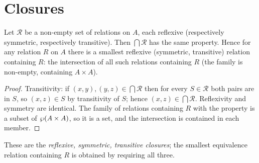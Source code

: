 \section{Closures}

\begin{proposition}\label{prop:closure}
	Let $\mathcal R$ be a non-empty set of relations on $A$, each reflexive (respectively symmetric, respectively transitive). Then $\bigcap\mathcal R$ has the same property. Hence for any relation $R$ on $A$ there is a smallest reflexive (symmetric, transitive) relation containing $R$: the intersection of all such relations containing $R$ (the family is non-empty, containing $A\times A$).
\end{proposition}
\begin{proof}
	Transitivity: if $(x,y),(y,z)\in\bigcap\mathcal R$ then for every $S\in\mathcal R$ both pairs are in $S$, so $(x,z)\in S$ by transitivity of $S$; hence $(x,z)\in\bigcap\mathcal R$. Reflexivity and symmetry are identical. The family of relations containing $R$ with the property is a subset of $\wp(A\times A)$, so it is a set, and the intersection is contained in each member.
\end{proof}
These are the \emph{reflexive, symmetric, transitive closures}; the smallest equivalence relation containing $R$ is obtained by requiring all three.